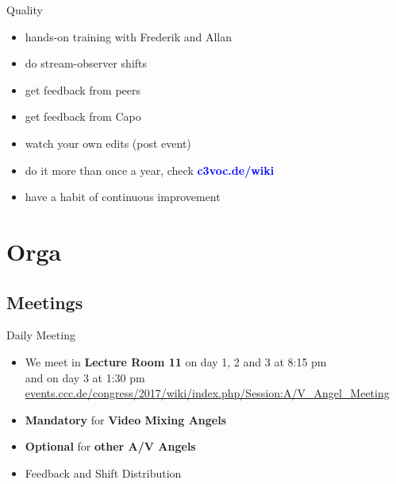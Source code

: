 \documentclass[hyperref={pdfpagelabels=false},aspectratio=169]{beamer}
\begin{document}
\begin{frame}{Quality}
\begin{itemize} %
\item hands-on training with Frederik and Allan %
\item do stream-observer shifts %
\item get feedback from peers %
\item get feedback from Capo %
\item watch your own edits (post event) %
\item do it more than once a year, check 
\textcolor{blue}{\textbf{c3voc.de/wiki }} %
\item have a habit of continuous improvement %
\end{itemize} 
\end{frame}

\section{Orga} %
\subsection{Meetings}
\begin{frame}{Daily Meeting}
\begin{itemize}
\item We meet in \textbf{Lecture Room 11} on day 1, 2 and 3 at 8:15 pm \\and on day 3 at 1:30 pm \\
\renewcommand\UrlFont{\color{blue}\sffamily\textbf}
\url{events.ccc.de/congress/2017/wiki/index.php/Session:A/V_Angel_Meeting}
\item  \textbf{Mandatory} for \textbf{Video Mixing Angels}
\item  \textbf{Optional} for \textbf{other A/V Angels}
\item  Feedback and Shift Distribution
\end{itemize} 
\end{frame}
\end{document}
